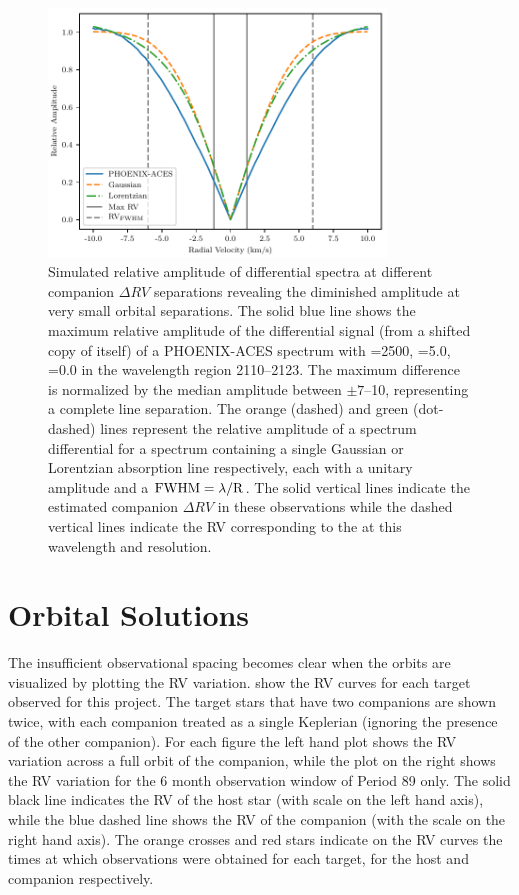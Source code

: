 \begin{figure}
    \centering
    \includegraphics[width=0.8\textwidth]{figures/direct-recovery/rv_diff_final.pdf}
    \caption[Simulated relative amplitude of differntial spectrum.]{Simulated relative amplitude of differential spectra at different companion \(\Delta {RV}\) separations revealing the diminished amplitude at very small orbital separations.
    The solid blue line shows the maximum relative amplitude of the differential signal (from a shifted copy of itself) of a {PHOENIX-ACES} spectrum with \Teff{}=2500\K{}, \Logg{}=5.0, \feh{}=0.0 in the wavelength region 2110--2123\nm{}.
    The maximum difference is normalized by the median amplitude between \(\pm7\)--10\kmps{}, representing a complete line separation.
    The orange (dashed) and green (dot-dashed) lines represent the relative amplitude of a spectrum differential for a spectrum containing a single Gaussian or Lorentzian absorption line respectively, each with a unitary amplitude and a \(\rm {\textrm{FWHM}} = \lambda / R\).
    The solid vertical lines indicate the estimated companion \(\Delta {RV}\) in these observations while the dashed vertical lines indicate the {RV} corresponding to the {\fwhm} at this wavelength and resolution.}
    \label{fig:diff_amp}
\end{figure}


\section{Orbital Solutions}
\label{sec:orbtial_diagrams}
The insufficient observational spacing becomes clear when the orbits are visualized by plotting the {RV} variation.
 show the {RV} curves for each target observed for this project.
The target stars that have two companions are shown twice, with each companion treated as a single Keplerian (ignoring the presence of the other companion).
For each figure the left hand plot shows the {RV} variation across a full orbit of the companion, while the plot on the right shows the {RV} variation for the 6 month observation window of {Period 89} only.
The solid black line indicates the {RV} of the host star (with scale on the left hand axis), while the blue dashed line shows the {RV} of the companion (with the scale on the right hand axis).
The orange crosses and red stars indicate on the {RV} curves the times at which observations were obtained for each target, for the host and companion respectively.

